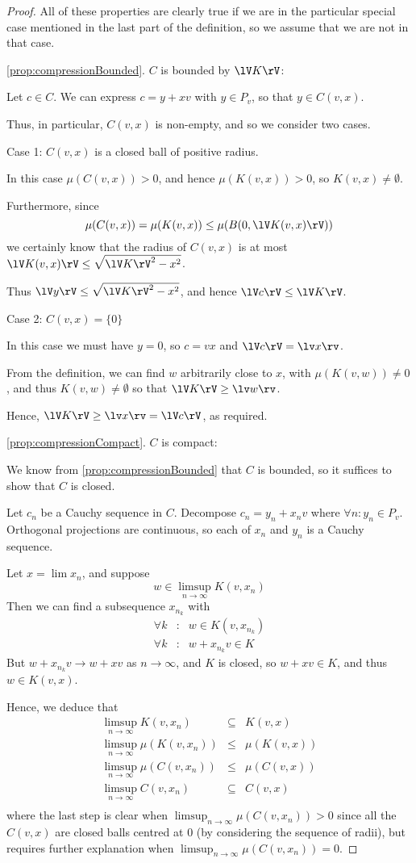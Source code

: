 \documentclass[a4paper,11pt]{article}
\begin{document}
\begin{proof}
All of these properties are clearly true if we are in the particular special
case mentioned in the last part of the definition, so we assume that we are not
in that case.

\ref{prop:compressionBounded}. $C$ is bounded by $\lV K\rV$:

Let $c\in C$.  We can express $c=y+xv$ with $y\in P_v$, so that $y\in C(v,x)$.

Thus, in particular, $C(v,x)$ is non-empty, and so we consider two cases.

Case 1: $C(v,x)$ is a closed ball of positive radius.

In this case
$\mu(C(v,x))>0$, and hence $\mu(K(v,x))>0$, so $K(v,x)\not=\emptyset$.

Furthermore, since
\[
\mu(C(v,x))=\mu(K(v,x))\leq\mu(B(0,\lV K(v,x)\rV))
\]
we certainly know that the radius
of $C(v,x)$ is at most $\lV K(v,x)\rV\leq\sqrt{\lV K\rV^2-x^2}$.

Thus $\lV y\rV\leq\sqrt{\lV K\rV^2-x^2}$, and hence $\lV c\rV\leq\lV K\rV$.

Case 2: $C(v,x)=\{0\}$

In this case we must have $y=0$, so $c=vx$ and $\lV c\rV=\lv x\rv$.

From the definition, we can find $w$
arbitrarily close to $x$, with $\mu(K(v,w))\not=0$, and thus
$K(v,w)\not=\emptyset$ so that $\lV K\rV\geq\lv w\rv$.

Hence, $\lV K\rV\geq\lv x\rv=\lV c\rV$, as required.

\ref{prop:compressionCompact}. $C$ is compact:

We know from \ref{prop:compressionBounded} that $C$ is bounded, so it suffices
to show that $C$ is closed.

Let $c_n$ be a Cauchy sequence in $C$.  Decompose $c_n=y_n+x_nv$ where
$\forall n:y_n\in P_v$.  Orthogonal projections are continuous, so each of
$x_n$ and $y_n$ is a Cauchy sequence.

Let $x=\lim x_n$, and suppose
\[
w\in\limsup_{n\to\infty}K(v,x_n)
\]
Then we can find a subsequence $x_{n_k}$ with
%
\begin{eqnarray*}
\forall k&:&w\in K(v,x_{n_k}) \\
\forall k&:&w+x_{n_k}v\in K
\end{eqnarray*}
%
But $w+x_{n_k}v\to w+xv$ as $n\to\infty$, and $K$ is closed, so $w+xv\in K$,
and thus $w\in K(v,x)$.

Hence, we deduce that
%
\begin{eqnarray*}
\limsup_{n\to\infty} K(v,x_n) &\subseteq& K(v,x) \\
\limsup_{n\to\infty}\mu(K(v,x_n)) &\leq& \mu(K(v,x)) \\
\limsup_{n\to\infty}\mu(C(v,x_n)) &\leq& \mu(C(v,x)) \\
\limsup_{n\to\infty}C(v,x_n) &\subseteq& C(v,x) \\
\end{eqnarray*}
%
where the last step is clear when $\limsup_{n\to\infty}\mu(C(v,x_n))>0$
since all the $C(v,x)$ are closed balls centred at $0$ (by considering the
sequence of radii),
but requires further explanation when $\limsup_{n\to\infty}\mu(C(v,x_n))=0$.


\end{proof}
\end{document}
